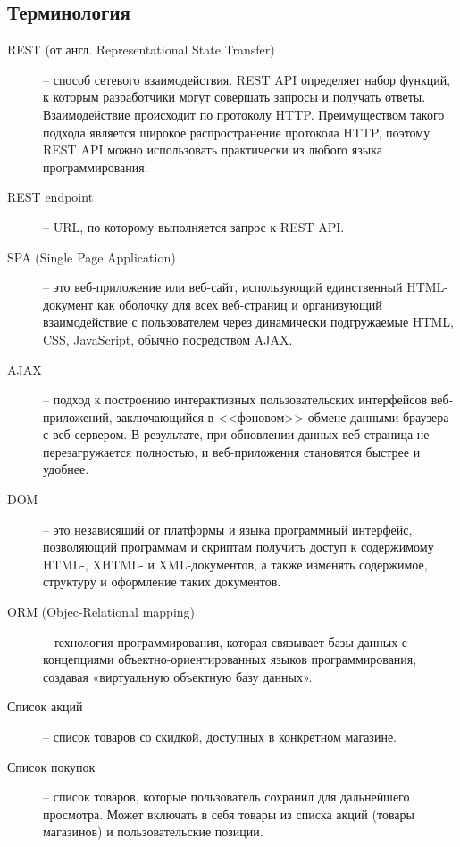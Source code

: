 \subsection{Терминология}
\begin{description}

  \item[REST (от англ. Representational State Transfer)] -- способ сетевого
    взаимодействия.  REST API определяет набор функций, к которым разработчики
    могут совершать запросы и получать ответы. Взаимодействие происходит по
    протоколу HTTP.  Преимуществом такого подхода является широкое
    распространение протокола HTTP, поэтому REST API можно использовать
    практически из любого языка программирования.

  \item[REST endpoint] -- URL, по которому выполняется запрос к REST API.

  \item[SPA (Single Page Application)] -- это веб-приложение или веб-сайт,
    использующий единственный HTML-документ как оболочку для всех веб-страниц и
    организующий взаимодействие с пользователем через динамически подгружаемые
    HTML, CSS, JavaScript, обычно посредством AJAX.

  \item[AJAX] -- подход к построению интерактивных пользовательских интерфейсов
    веб-приложений, заключающийся в <<фоновом>> обмене данными браузера с
    веб-сервером. В результате, при обновлении данных веб-страница не
    перезагружается полностью, и веб-приложения становятся быстрее и удобнее. 

  \item[DOM] -- это независящий от платформы и языка программный интерфейс,
    позволяющий программам и скриптам получить доступ к содержимому HTML-,
    XHTML- и XML-документов, а также изменять содержимое, структуру и
    оформление таких документов.
    
  \item[ORM (Objec-Relational mapping)] --
    технология программирования, которая связывает базы
    данных с концепциями объектно-ориентированных языков программирования,
    создавая «виртуальную объектную базу данных».

  \item[Список акций] -- список товаров со скидкой, доступных в конкретном магазине.

  \item[Список покупок] -- список товаров, которые пользователь сохранил для
    дальнейшего просмотра. Может включать в себя товары из списка акций (товары
    магазинов) и пользовательские позиции.

\end{description}
